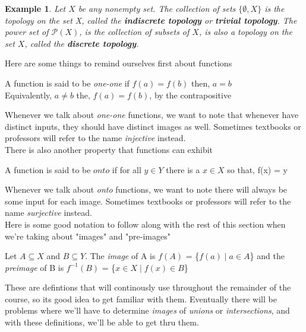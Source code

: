 \documentclass{article}
\newtheorem*{example*}{Example}
\begin{document}
\begin{tcolorbox}[colback=example!65]
    \begin{example*}
        Let $X$ be any nonempty set. The collection of sets $\{\emptyset, X\}$ is the topology on the set X, called the \textbf{indiscrete topology} or \textbf{trivial topology}. The power set of $\mathcal{P}(X)$, is the collection of subsets of $X$, is also a topology on the set $X$, called the \textbf{discrete topology}.
    \end{example*}
\end{tcolorbox}

\newpage

Here are some things to remind ourselves first about functions
\begin{tcolorbox}[colback=definition!65]
   A function is said to be \textit{one-one} if $f(a) = f(b)$ then, $a = b$ \\
   Equivalently,
   $a \neq b$ the, $f(a) = f(b)$, by the contrapositive
\end{tcolorbox}
Whenever we talk about \textit{one-one} functions, we want to note that whenever have distinct inputs, they should have distinct images as well.
Sometimes textbooks or professors will refer to the name \textit{injective} instead.\\

There is also another property that functions can exhibit

\begin{tcolorbox}[colback=definition!65]
    A function is said to be $onto$ if for all $y \in Y$ there is a $x \in X$ so that, f(x) = y
\end{tcolorbox}
Whenever we talk about \textit{onto} functions, we want to note there will always be some input for each image. Sometimes textbooks or professors will refer to the name \textit{surjective} instead. \\

Here is some good notation to follow along with the rest of this section when we're taking about "images" and "pre-images"

\begin{tcolorbox}[colback=definition!65]
    Let $A \subseteq X$ and $B \subseteq Y$.
    The \textit{image} of A is $f(A)$ = \{$f(a) \mid a \in A $\} and the \textit{preimage} of B is $f^{-1}(B)$ = \{$x \in X \mid f(x) \in B$\}
\end{tcolorbox}

These are defintions that will continously use throughout the remainder of the course, so its good idea to get familiar with them. Eventually there will be problems where we'll have to determine \textit{images} of \textit{unions} or \textit{intersections}, and with these definitions, we'll be able to get thru them.
\end{document}
